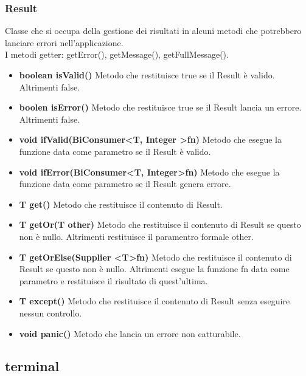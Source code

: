 \documentclass[a4paper, 12pt]{report}
\begin{document}
				\subsubsection{Result}
				Classe che si occupa della gestione dei risultati in alcuni metodi che potrebbero lanciare errori nell'applicazione.\\
				I metodi getter: getError(), getMessage(), getFullMessage().
				\begin{itemize}
				\item\textbf{boolean isValid()}
				Metodo che restituisce true se il Result è valido. Altrimenti false.
				\item\textbf{boolen isError()}
				Metodo che restituisce true se il Result lancia un errore. Altrimenti false.
				
				\item\textbf{void ifValid(BiConsumer\textless T, Integer \textgreater fn)}
				Metodo che esegue la funzione data come parametro se il Result è valido.
				
				\item\textbf{void ifError(BiConsumer\textless T, Integer\textgreater fn)}
				Metodo che esegue la funzione data come parametro se il Result genera errore. 
				
				\item \textbf{T get()}
				Metodo che restituisce il contenuto di Result.
				
				\item \textbf{T getOr(T other)}
				Metodo che restituisce il contenuto di Result se questo non è nullo. Altrimenti restituisce il paramentro formale other.
				
				\item \textbf{T getOrElse(Supplier \textless T\textgreater fn)}
				Metodo che restituisce il contenuto di Result se questo non è nullo. Altrimenti esegue la funzione fn data come parametro e restituisce il risultato di quest'ultima.
				
				\item  \textbf{T except()}
				Metodo che restituisce il contenuto di Result senza eseguire nessun controllo.
				
				\item \textbf{void panic()}
				Metodo che lancia un errore non catturabile.
				
				\end{itemize}
							
			\subsection{terminal}
\end{document}
